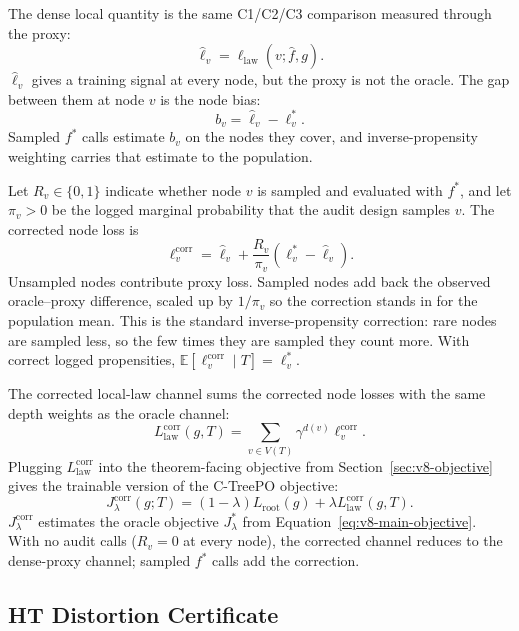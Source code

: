 The dense local quantity is the same C1/C2/C3 comparison measured
through the proxy:
\[
  \widehat\ell_v
  =
  \ell_{\mathrm{law}}(v;\widehat f,g).
\]
\(\widehat\ell_v\) gives a training signal at every node, but the
proxy is not the oracle. The gap between them at node \(v\) is the
node bias:
\[
  b_v=\widehat\ell_v-\ell_v^\ast .
\]
Sampled \(f^\ast\) calls estimate \(b_v\) on the nodes they cover, and
inverse-propensity weighting carries that estimate to the population.

Let \(R_v\in\{0,1\}\) indicate whether node \(v\) is sampled and
evaluated with \(f^\ast\), and let \(\pi_v>0\) be the logged marginal
probability that the audit design samples \(v\). The corrected node
loss is
\begin{equation}
\label{eq:v8-corrected-node-loss}
  \ell_v^{\mathrm{corr}}
  =
  \widehat\ell_v
  +
  \frac{R_v}{\pi_v}
  \left(\ell_v^\ast-\widehat\ell_v\right).
\end{equation}
Unsampled nodes contribute proxy loss. Sampled nodes add back the
observed oracle--proxy difference, scaled up by \(1/\pi_v\) so the
correction stands in for the population mean. This is the standard
inverse-propensity correction: rare nodes are sampled less, so the few
times they are sampled they count more. With correct logged
propensities, \(\mathbb E[\ell_v^{\mathrm{corr}}\mid T]=\ell_v^\ast\).

The corrected local-law channel sums the corrected node losses with
the same depth weights as the oracle channel:
\[
  L_{\mathrm{law}}^{\mathrm{corr}}(g,T)
  =
  \sum_{v\in V(T)}\gamma^{d(v)}\ell_v^{\mathrm{corr}} .
\]
Plugging \(L_{\mathrm{law}}^{\mathrm{corr}}\) into the
theorem-facing objective from Section~\ref{sec:v8-objective} gives
the trainable version of the C-TreePO objective:
\begin{equation}
\label{eq:v8-corrected-objective}
  J_\lambda^{\mathrm{corr}}(g;T)
  =
  (1-\lambda)L_{\mathrm{root}}(g)
  +
  \lambda L_{\mathrm{law}}^{\mathrm{corr}}(g,T).
\end{equation}
\(J_\lambda^{\mathrm{corr}}\) estimates the oracle objective
\(J_\lambda^\ast\) from
Equation~\eqref{eq:v8-main-objective}. With no audit calls
(\(R_v=0\) at every node), the corrected channel reduces to the
dense-proxy channel; sampled \(f^\ast\) calls add the correction.

\subsection{HT Distortion Certificate}

